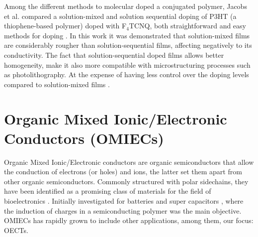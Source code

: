 Among the different methods to molecular doped a conjugated polymer, Jacobs et al. compared a solution-mixed and solution sequential doping of P3HT (a thiophene-based polymer) doped with F$_{4}$TCNQ, both straightforward and easy methods for doping \cite{jacobsComparisonSolutionmixedSequentially2016}. In this work it was demonstrated that solution-mixed films are considerably rougher than solution-sequential films, affecting negatively to its conductivity. The fact that solution-sequential doped films allows better homogeneity, make it also more compatible with microstructuring processes such as photolithography. At the expense of having less control over the doping levels compared to solution-mixed films \cite{tanOrganicMixedIonic2022}.




\section{Organic Mixed Ionic/Electronic Conductors (OMIECs)} \label{sec:omiecs}

Organic Mixed Ionic/Electronic conductors are organic semiconductors that allow the conduction of electrons (or holes) and ions, the latter set them apart from other organic semiconductors. %
Commonly structured with polar sidechains, they have been identified as a promising class of materials for the field of bioelectronics
\cite{giovannittiEnergeticControlRedoxActive2020}. Initially investigated for batteries and super capacitors \cite{snookConductingpolymerbasedSupercapacitorDevices2011}
\cite{liangOrganicElectrodeMaterials2012}, where the induction of charges in a semiconducting polymer was the main objective. OMIECs has rapidly grown to include other applications, among them, our focus: OECTs.\\

